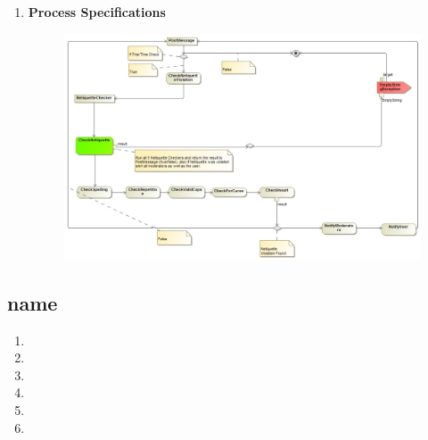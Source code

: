 \documentclass[11pt]{article}
\begin{document}
\begin{enumerate}
\begin{figure}[H]
	  		\end{figure}
	  		\newpage
\item \textbf{Process Specifications}
	  		\begin{figure}[H]
	  			\includegraphics[scale=0.40]{NetProcessDiagram.jpg}
	  		\end{figure}
\end{enumerate}

\newpage

\subsection{name}
\begin{enumerate}
\item 
\item 
\item 
\item 
\item 
\item 
\end{enumerate}

\newpage
\end{document}
